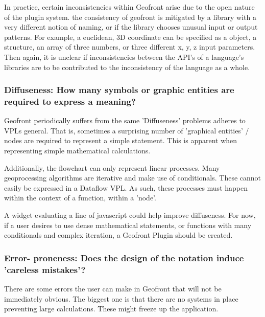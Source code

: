 In practice, certain inconsistencies within Geofront arise due to the open nature of the plugin system. 
the consistency of geofront is mitigated by a library with a very different notion of naming, or if the library chooses unusual input or output patterns. 
For example, a euclidean, 3D coordinate can be specified as a  object, a structure, an array of three numbers, or three different x, y, z input parameters.
Then again, it is unclear if inconsistencies between the API's of a language's libraries are to be contributed to the inconsistency of the language as a whole. 


\subsubsection*{Diffuseness: How many symbols or graphic entities are required to express a meaning?}

Geofront periodically suffers from the same 'Diffuseness' problems \cite{green_usability_1996} adheres to VPLs general. 
That is, sometimes a surprising number of 'graphical entities' / nodes are required to represent a simple statement.  
This is apparent when representing simple mathematical calculations. 

Additionally, the flowchart can only represent linear processes. Many geoprocessing algorithms are iterative and make use of conditionals. These cannot easily be expressed in a Dataflow VPL. As such, these processes must happen within the context of a function, within a 'node'.

A widget evaluating a line of javascript could help improve diffuseness. For now, if a user desires to use dense mathematical statements, or functions with many conditionals and complex iteration, a Geofront Plugin should be created.



\subsubsection*{Error- proneness: Does the design of the notation induce 'careless mistakes'?}

There are some errors the user can make  in Geofront that will not be immediately obvious. 
The biggest one is that there are no systems in place preventing large calculations. 
These might freeze up the application. 

